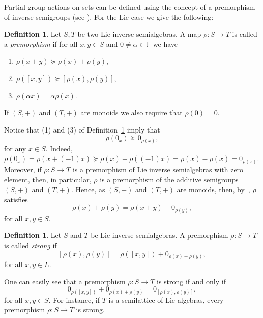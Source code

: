 \documentclass[10pt,a4paper]{amsart}
\theoremstyle{definition}
\newtheorem{defn}[thm]{Definition}
\theoremstyle{remark}
\numberwithin{equation}{section}
\newtheorem*{Theorem A}{\textbf{Theorem A}}
\newtheorem*{Corollary E}{\textbf{Corollary E}}
\newtheorem*{Corollary F}{\textbf{Corollary F}}
\newtheorem*{Theorem B}{\textbf{Theorem B}}
\newtheorem*{Theorem C}{\textbf{Theorem C}}
\newtheorem*{Theorem D}{\textbf{Theorem B}}
\newtheorem*{p a}{\textbf{Proof of  Theorem A}}
\newtheorem*{p b}{\textbf{Proof of Theorem B}}
\newtheorem*{p c}{\textbf{Proof of  Theorem C}}
\newtheorem*{p d}{\textbf{Proof of  Theorem D}}
\newcommand{\F}{\mathbb{F}}
\newcommand{\0}{{\vartheta}}
\begin{document}

 Partial group actions on sets can be defined using the concept of a premorphism of inverse semigroups (see \cite{KL}). For the Lie case we give the following:
\begin{defn}\label{def:premorphism}
Let  $S,T$ be two Lie inverse semialgebras. A map $\rho:S\rightarrow T$ is called a {\em premorphism} if for all $x,y\in S$ and $0\neq\alpha\in \F$ we have
\begin{enumerate}
\item $\rho(x+y)\succeq \rho(x)+\rho(y),$
         \item $\rho([x,y])\succeq [\rho(x),\rho(y)],$
         \item $\rho(\alpha x)=\alpha \rho(x)$.  
\end{enumerate}
If  $(S,+)$ and $(T,+)$ are monoids we also require that $\rho(0)=0.$  
\end{defn}

 Notice that (1) and (3) of Definition~\ref{def:premorphism} imply that 
$$\rho (0_x) \succeq 0_{\rho(x)},$$  for any $x\in S.$ Indeed, $ \rho (0_x) = \rho (x + (-1)x) \succeq 
 \rho (x)  + \rho((-1)x)=  \rho (x)  - \rho(x)=
 0_{\rho(x)}.$ Moreover,
if $\rho: S\to T$ is a premorphism of Lie inverse semialgebras with zero element, then, in particular, $\rho$ is a premorphism of the additive semigroups $(S,+)$ and $(T,+)$. Hence, as $(S,+)$ and $(T,+)$ are monoids, then, by~\cite[Proposition 2.1]{KL}, $\rho$ satisfies
\begin{equation}\label{eq-premorphism}
    \rho(x)+\rho(y)=\rho(x+y)+0_{\rho(y)},
\end{equation}
for all $x,y\in S$. 



\begin{defn}\label{strong}
 Let $S$ and $T$ be Lie inverse semialgebras.  
A premorphism $\rho:S \rightarrow T$ is called {\em strong} if
$$ [\rho(x),\rho(y)]=\rho([x,y])+0_{\rho(x)+\rho(y)},
$$ for all $x,y \in L.$  
\end{defn}




One can easily see that  a premorphism  $\rho:S \rightarrow T$ is strong if and only if
\begin{equation}
0_{\rho([x,y])}+0_{\rho(x)+\rho(y)}=0_{[\rho(x),\rho(y)]},
\end{equation}
for all $x,y\in S$. For instance, if $T$ is a semilattice of Lie algebras,  every premorphism $\rho: S\to  T$ is strong. 
\end{document}
